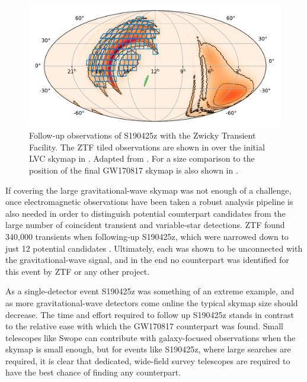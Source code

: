 \begin{colsection}
\newpage

\begin{figure}[t]
    \begin{center}
        \includegraphics[width=0.9\linewidth]{images/190425_ztf.pdf}
    \end{center}
    \caption[Follow-up observations of S190425z with ZTF]{
        Follow-up observations of S190425z with the Zwicky Transient Facility. The ZTF tiled observations are shown in  over the initial LVC skymap in . Adapted from \citet{S190425z_ZTF}. For a size comparison to  the position of the final GW170817 skymap is also shown in .
        }\label{fig:ztf}
\end{figure}

If covering the large gravitational-wave skymap was not enough of a challenge, once electromagnetic observations have been taken a robust analysis pipeline is also needed in order to distinguish potential counterpart candidates from the large number of coincident transient and variable-star detections. ZTF found 340,000 transients when following-up S190425z, which were narrowed down to just 12 potential candidates \citep{S190425z_ZTF}. Ultimately, each was shown to be unconnected with the gravitational-wave signal, and in the end no counterpart was identified for this event by ZTF or any other project.

As a single-detector event S190425z was something of an extreme example, and as more gravitational-wave detectors come online the typical skymap size should decrease. The time and effort required to follow up S190425z stands in contrast to the relative ease with which the GW170817 counterpart was found. Small telescopes like Swope can contribute with galaxy-focused observations when the skymap is small enough, but for events like S190425z, where large searches are required, it is clear that dedicated, wide-field survey telescopes are required to have the best chance of finding any counterpart.

\newpage

\end{colsection}

